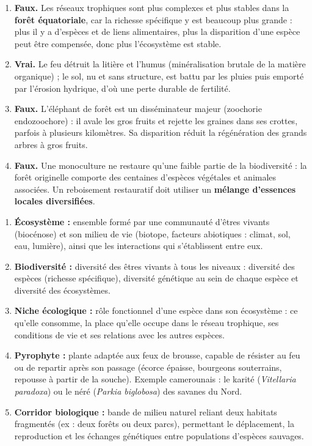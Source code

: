\documentclass[11pt]{article}
\newcommand{\cle}[1]{{\popxbold\color{popdark}#1}}
\begin{document}
\begin{corrige}
\begin{enumerate}
    \item \textbf{Faux.} Les réseaux trophiques sont plus complexes et plus stables dans la \textbf{forêt équatoriale}, car la richesse spécifique y est beaucoup plus grande : plus il y a d'espèces et de liens alimentaires, plus la disparition d'une espèce peut être compensée, donc plus l'écosystème est stable.
    \item \textbf{Vrai.} Le feu détruit la litière et l'humus (minéralisation brutale de la matière organique) ; le sol, nu et sans structure, est battu par les pluies puis emporté par l'érosion hydrique, d'où une perte durable de fertilité.
    \item \textbf{Faux.} L'éléphant de forêt est un disséminateur majeur (\cle{zoochorie} endozoochore) : il avale les gros fruits et rejette les graines dans ses crottes, parfois à plusieurs kilomètres. Sa disparition réduit la régénération des grands arbres à gros fruits.
    \item \textbf{Faux.} Une monoculture ne restaure qu'une faible partie de la biodiversité : la forêt originelle comporte des centaines d'espèces végétales et animales associées. Un reboisement restauratif doit utiliser un \textbf{mélange d'essences locales diversifiées}.
\end{enumerate}
\end{corrige}

\begin{corrige}
\begin{enumerate}
    \item \textbf{Écosystème :} ensemble formé par une communauté d'êtres vivants (\cle{biocénose}) et son milieu de vie (\cle{biotope}, facteurs abiotiques : climat, sol, eau, lumière), ainsi que les interactions qui s'établissent entre eux.
    \item \textbf{Biodiversité :} diversité des êtres vivants à tous les niveaux : diversité des espèces (richesse spécifique), diversité génétique au sein de chaque espèce et diversité des écosystèmes.
    \item \textbf{Niche écologique :} rôle fonctionnel d'une espèce dans son écosystème : ce qu'elle consomme, la place qu'elle occupe dans le réseau trophique, ses conditions de vie et ses relations avec les autres espèces.
    \item \textbf{Pyrophyte :} plante adaptée aux feux de brousse, capable de résister au feu ou de repartir après son passage (écorce épaisse, bourgeons souterrains, repousse à partir de la souche). Exemple camerounais : le karité (\emph{Vitellaria paradoxa}) ou le néré (\emph{Parkia biglobosa}) des savanes du Nord.
    \item \textbf{Corridor biologique :} bande de milieu naturel reliant deux habitats fragmentés (ex : deux forêts ou deux parcs), permettant le déplacement, la reproduction et les échanges génétiques entre populations d'espèces sauvages.
\end{enumerate}
\end{corrige}
\end{document}

